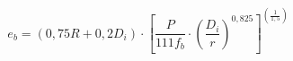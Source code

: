 \documentclass[12pt]{article}
\begin{document}
\begin{displaymath}
e_b = \left( 0,75R + 0,2D_i \right) \cdot \left[ { \frac {P} {111f_b} } \cdot { \left( \frac {D_i} {r} \right) ^{0,825} } \right]^{\left( \frac {1} {1,5} \right) }
\end{displaymath}
\end{document}
